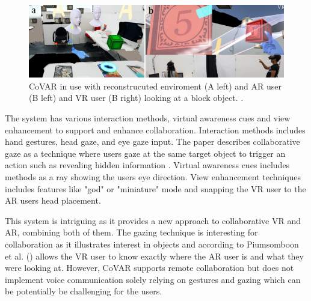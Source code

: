 \begin{figure}[!ht]
     \centering
     \includegraphics[width=.9\textwidth]{./fig/related_work/coVAR.png}
     \captionsetup{width=0.9\linewidth}
     \caption{CoVAR in use with reconstrucuted enviroment (A left) and AR user (B left) and VR user (B right) looking at a block object.  \cite{greenwald2019electrovr}. }
     \label{fig:coVAR}
 \end{figure}

The system has various interaction methods, virtual awareness cues and view enhancement to support and enhance collaboration. Interaction methods includes hand gestures, head gaze, and eye gaze input. The paper describes collaborative gaze as a technique where users gaze at the same target object to trigger an action such as revealing hidden information \cite{piumsomboon2017covar}.  Virtual awareness cues includes methods as a ray showing the users eye direction. View enhancement techniques includes features like "god" or "miniature" mode and snapping the VR user to the AR users head placement.

This system is intriguing as it provides a new approach to collaborative VR and AR, combining both of them. The gazing technique is interesting for collaboration as it illustrates interest in objects and according to Piumsomboon et al. (\citeyear{piumsomboon2017covar}) allows the VR user to know exactly where the AR user is and what they were looking at. However, CoVAR supports remote collaboration but does not implement voice communication solely relying on gestures and gazing which can be potentially be challenging for the users.   




